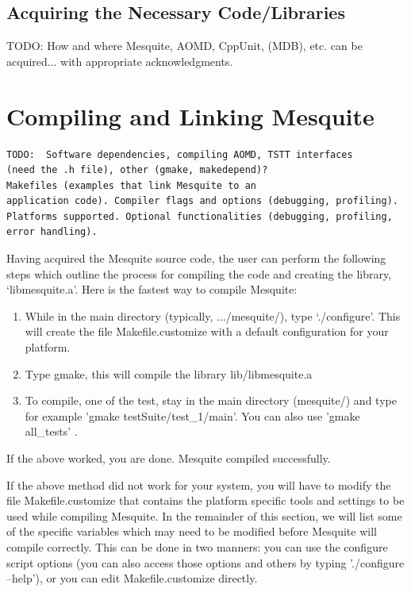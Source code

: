\documentclass[letter]{report}
\begin{document}
\subsection{Acquiring the Necessary Code/Libraries}
TODO:  How and where Mesquite, AOMD, CppUnit, (MDB), etc. can be
acquired... with appropriate acknowledgments.

\section{Compiling and Linking Mesquite}
\label{sec:compiling}
\begin{verbatim}
TODO:  Software dependencies, compiling AOMD, TSTT interfaces
(need the .h file), other (gmake, makedepend)?  
Makefiles (examples that link Mesquite to an 
application code). Compiler flags and options (debugging, profiling). 
Platforms supported. Optional functionalities (debugging, profiling, 
error handling).
\end{verbatim}

Having acquired the Mesquite source code, the user can perform the
following steps which outline the process for compiling the code and
creating the library, `libmesquite.a'. Here is the fastest way to compile Mesquite:
\begin{enumerate}
\item While in the main directory (typically, .../mesquite/), type
`./configure'.  This will create the file Makefile.customize with a default configuration
for your platform.
\item Type gmake, this will compile the library lib/libmesquite.a
\item To compile, one of the test, stay in the main directory (mesquite/) and type 
for example 'gmake testSuite/test\_1/main'. You can also use 'gmake all\_tests' .
\end{enumerate}
If the above worked, you are done. Mesquite compiled successfully. 

If the above method did not work for your system, you will have to modify the file
Makefile.customize that contains the platform specific tools and settings to be used 
while compiling Mesquite. In the remainder of this section, we
will  list some of the specific variables which
may need to be modified before Mesquite will compile correctly.
This can be done in two manners: you can use the configure
script options (you can also access those options and
others by typing './configure --help'), or you can edit
Makefile.customize directly.
\end{document}
